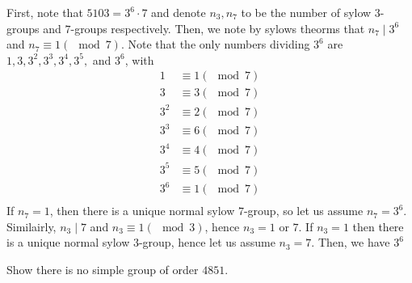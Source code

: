 \documentclass[a4paper]{article}
\begin{document}
\begin{solution}
	First, note that \(5103 = 3^{6} \cdot 7\) and denote \(n_3, n_7\) to be the number of sylow \(3\)-groups and \(7\)-groups respectively. Then, we note by sylows theorms that \(n_7 \mid 3^{6}\) and \(n_7 \equiv 1 \left( \mod 7 \right) \). Note that the only numbers dividing \(3^{6}\) are \(1, 3, 3^2, 3^3, 3^{4}, 3^{5}, \) and \(3^{6}\), with
	\begin{align*}
		1 &\equiv 1 \left( \mod 7 \right) \\
		3 &\equiv 3 \left( \mod 7 \right) \\
		3^2 &\equiv 2 \left( \mod 7 \right) \\
		3^3 &\equiv 6 \left( \mod 7 \right) \\
		3^{4} &\equiv 4 \left( \mod 7 \right) \\
		3^{5} &\equiv 5 \left( \mod 7 \right) \\
		3^{6} &\equiv 1 \left( \mod 7 \right) \\
		\end{align*}
		If \(n_7 = 1\), then there is a unique normal sylow \(7\)-group, so let us assume \(n_7 = 3^{6}\). Similairly, \(n_3 \mid 7\) and \(n_3 \equiv 1 \left( \mod 3 \right) \), hence \(n_3 = 1\) or \(7\). If \(n_3 = 1\)  then there is a unique normal sylow \(3\)-group, hence let us assume \(n_3 = 7\). Then, we have \(3^{6}\)
\end{solution}
\newpage
\begin{problem}[5]
	Show there is no simple group of order \(4851\).
\end{problem}
\begin{solution}
\end{solution}
\end{document}
